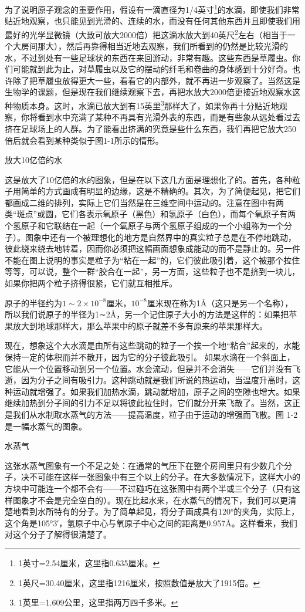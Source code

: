 \documentclass[11pt,oneside]{book}
\begin{document}
\begin{common-format}
为了说明原子观念的重要作用，假设有一滴直径为1/4英寸\footnote{1英寸=2.54厘米，这里指0.635厘米。}的水滴，即使我们非常贴近地观察，也只能见到光滑的、连续的水，而没有任何其他东西并且即使我们用最好的光学显微镜（大致可放大2000倍）把这滴水放大到40英尺\footnote{1英尺=30.40厘米，这里指1216厘米，按照数值是放大了1915倍。}左右（相当于一个大房间那大），然后再靠得相当近地去观察，我们所看到的仍然是比较光滑的水，不过到处有一些足球状的东西在来回游动，非常有趣。这些东西是草履虫。你们可能就到此为止，对草履虫以及它的摆动的纤毛和卷曲的身体感到十分好奇。也许除了把草履虫放得更大一些，看看它的内部外，就不再进一步观察了。当然这是生物学的课题，但是现在我们继续观察下去，再把水放大2000倍更接近地观察水这种物质本身。这时，水滴已放大到有15英里\footnote{1英里=1.609公里，这里指两万四千多米。}那样大了，如果你再十分贴近地观察，你将看到水中充满了某种不再具有光滑外表的东西，而是有些象从远处看过去挤在足球场上的人群。为了能看出挤满的究竟是些什么东西，我们再把它放大250倍后就会看到某种类似于图1-1所示的情形。
\begin{fig}{放大10亿倍的水}
\label{fig:放大10亿倍的水}
\end{fig}
这是放大了10亿倍的水的图象，但是在以下这几方面是理想化了的。首先，各种粒子用简单的方式画成有明显的边缘，这是不精确的。其次，为了简便起见，把它们都画成二维的排列，实际上它们当然是在三维空间中运动的。注意在图中有两类“斑点”或圆，它们各表示氧原子（黑色）和氢原子（白色），而每个氧原子有两个氢原子和它联结在一起（一个氧原子与两个氢原子组成的一个小组称为一个分子）。图象中还有一个被理想化的地方是自然界中的真实粒子总是在不停地跳动，彼此绕来绕去地转着，因而你必须把这幅画面想象成能动的而不是静止的。另一件不能在图上说明的事实是粒子为“粘在一起”的，它们彼此吸引着，这个被那个拉住等等，可以说，整个一群“胶合在一起”，另一方面，这些粒子也不是挤到一块儿，如果你把两个粒子挤得很紧，它们就互相推斥。

原子的半径约为$1\sim2\times10^{-8}$厘米，$ 10^{-8} $厘米现在称为1Å（这只是另一个名称），所以我们说原子的半径为1∼2Å，另一个记住原子大小的方法是这样的：如果把苹果放大到地球那样大，那么苹果中的原子就差不多有原来的苹果那样大。

现在，想象这个大水滴是由所有这些跳动的粒子一个挨一个地“粘合”起来的，水能保持一定的体积而并不散开，因为它的分子彼此吸引。 如果水滴在一个斜面上，它能从一个位置移动到另一个位置。水会流动，但是并不会消失——它们并没有飞逝，因为分子之间有吸引力。这种跳动就是我们所说的热运动，当温度升高时，这种运动就增强了。如果我们加热水滴，跳动就增加，原子之间的空隙也增大。如果继续加热到分子间的引力不足以将彼此拉住时，它们就分开来飞散了。当然，这正是我们从水制取水蒸气的方法——提高温度，粒子由于运动的增强而飞散。图 1-2是一幅水蒸气的图象。
\begin{fig}{水蒸气}
\label{fig:水蒸气}
\end{fig}
这张水蒸气图象有一个不足之处：在通常的气压下在整个房间里只有少数几个分子，决不可能在这样一张图象中有三个以上的分子。在大多数情况下，这样大小的方块中可能连一个都不会有——不过碰巧在这张图中有两个半或三个分子（只有这样图象才不会是完全空白的）。现在比起水来，在水蒸气的情况下，我们可以更清楚地看到水所特有的分子。为了简单起见，将分子画成具有120°的夹角，实际上，这个角是105°3′，氢原子中心与氧原子中心之间的距离是0.957Å。这样看来，我们对这个分子了解得很清楚了。


\end{common-format}
\end{document}

